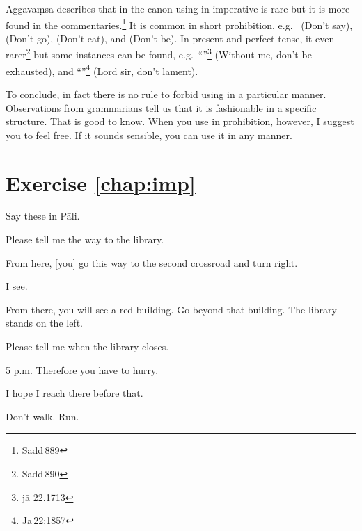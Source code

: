 Aggava\d msa describes that in the canon using  in imperative is rare but it is more found in the commentaries.\footnote{Sadd\,889} It is common in short prohibition, e.g.\  (Don't say),  (Don't go),  (Don't eat), and  (Don't be). In present and perfect tense, it even rarer\footnote{Sadd\,890} but some instances can be found, e.g.\ ``''\footnote{j\=a 22.1713} (Without me, don't be exhausted), and ``''\footnote{Ja\,22:1857} (Lord sir, don't lament).

To conclude, in fact there is no rule to forbid using  in a particular manner. Observations from grammarians tell us that it is fashionable in a specific structure. That is good to know. When you use  in prohibition, however, I suggest you to feel free. If it sounds sensible, you can use it in any manner.

\section*{Exercise \ref{chap:imp}}
Say these in P\=ali.
\begin{compactenum}
\item Please tell me the way to the library.
\item From here, [you] go this way to the second crossroad and turn right.
\item I see.
\item From there, you will see a red building. Go beyond that building. The library stands on the left.
\item Please tell me when the library closes.
\item 5 p.m. Therefore you have to hurry.
\item I hope I reach there before that.
\item Don't walk. Run.
\end{compactenum}

